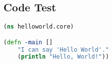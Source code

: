 \clojureColor
\subsection{Code Test}

    \begin{lstlisting}[language=clojure]
(ns helloworld.core)

(defn -main []
    "I can say 'Hello World'."
    (println "Hello, World!"))
    \end{lstlisting}
